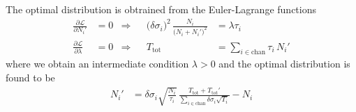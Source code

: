 \documentclass[11pt]{article}
\begin{document}
The optimal distribution is obtrained from the Euler-Lagrange functions
\begin{align}
  \frac{\partial\mathcal{L}}{\partial N_i'} &= 0
  &\Rightarrow&&
  \bigl(\delta\sigma_i\bigr)^2 \, \frac{N_i}{\bigl(N_i+N_i'\bigr)^2}
  &= \lambda \tau_i
  \\
  \frac{\partial\mathcal{L}}{\partial\lambda} &= 0
  &\Rightarrow&&
   T_\mathrm{tot}
  &= \sum_{i\in\mathrm{chan}} \tau_i \, N_i'
\end{align}
where we obtain an intermediate condition \(\lambda > 0\) and the optimal distribution is found to be
\begin{align}
  N_i'
  &=
  \delta\sigma_i \sqrt{\frac{N_i}{\tau_i}} \, \frac{T_\mathrm{tot}+T_\mathrm{tot}'}{\sum_{i\in\mathrm{chan}}\delta\sigma_i\sqrt{T_i}} - N_i
\end{align}
\end{document}
